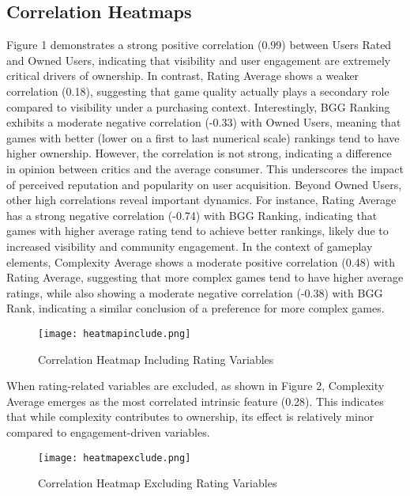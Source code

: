 \documentclass{article}
\begin{document}
\subsection{Correlation Heatmaps}
Figure 1 demonstrates a strong positive correlation (0.99) between Users Rated and Owned Users, indicating that visibility and user engagement are extremely critical drivers of ownership. In contrast, Rating Average shows a weaker correlation (0.18), suggesting that game quality actually plays a secondary role compared to visibility under a purchasing context. Interestingly, BGG Ranking exhibits a moderate negative correlation (-0.33) with Owned Users, meaning that games with better (lower on a first to last numerical scale) rankings tend to have higher ownership. However, the correlation is not strong, indicating a difference in opinion between critics and the average consumer. This underscores the impact of perceived reputation and popularity on user acquisition. Beyond Owned Users, other high correlations reveal important dynamics. For instance, Rating Average has a strong negative correlation (-0.74) with BGG Ranking, indicating that games with higher average rating tend to achieve better rankings, likely due to increased visibility and community engagement. In the context of gameplay elements, Complexity Average shows a moderate positive correlation (0.48) with Rating Average, suggesting that more complex games tend to have higher average ratings, while also showing a moderate negative correlation (-0.38) with BGG Rank, indicating a similar conclusion of a preference for more complex games.

\begin{figure}[H]
\centering
\texttt{[image: heatmapinclude.png]}
\caption{Correlation Heatmap Including Rating Variables}
\label{fig:heatmap_include}
\end{figure}

When rating-related variables are excluded, as shown in Figure 2, Complexity Average emerges as the most correlated intrinsic feature (0.28). This indicates that while complexity contributes to ownership, its effect is relatively minor compared to engagement-driven variables.

\begin{figure}[H]
\centering
\texttt{[image: heatmapexclude.png]}
\caption{Correlation Heatmap Excluding Rating Variables}
\label{fig:heatmap_exclude}
\end{figure}
\end{document}

